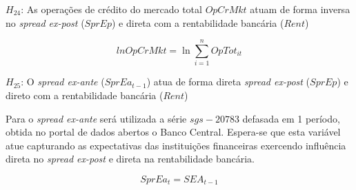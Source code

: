 \documentclass[
  12pt,
  12pt,
  openright,
  oneside,
  a4paper,
  chapter=TITLE,
  section=TITLE,
  subsection=TITLE,
  subsubsection=TITLE,
  english,
  portugues,
  sumario=tradicional]{abntex2}
\begin{document}
\(H_{24}\): As operações de crédito do mercado total \(OpCrMkt\) atuam de forma inversa no \emph{spread ex-post} (\(SprEp\)) e direta com a rentabilidade bancária (\(Rent\))

\begin{equation}
lnOpCrMkt = \ln\sum_{i = 1}^nOpTot_{it}
\end{equation}

\(H_{25}\): O \emph{spread ex-ante} (\(SprEa_{t-1}\)) atua de forma direta \emph{spread ex-post} (\(SprEp\)) e direto com a rentabilidade bancária (\(Rent\))

Para o \emph{spread ex-ante} será utilizada a série \(sgs-20783\) defasada em 1 período, obtida no portal de dados abertos o Banco Central. Espera-se que esta variável atue capturando as expectativas das instituições financeiras exercendo influência direta no \emph{spread ex-post} e direta na rentabilidade bancária.

\begin{equation}
SprEa_{t} = SEA_{t-1}
\end{equation}

\vspace{20pt}
\vspace{-2mm}
\linespread{2}
\end{document}
